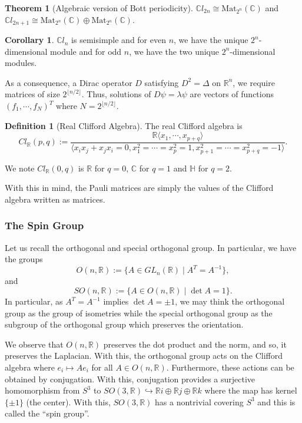 \documentclass[]{article}
\theoremstyle{definition}
\newtheorem{theorem}{Theorem}
\newtheorem{corollary}{Corollary}[theorem]
\theoremstyle{definition}
\newtheorem{definition}{Definition}[section]
\begin{document}
\begin{theorem}[Algebraic version of Bott periodicity]
  \(\mathbb{C}l_{2n} \cong \text{Mat}_{2^n}(\mathbb{C})\) and 
  \(\mathbb{C}l_{2n + 1} \cong \text{Mat}_{2^n}(\mathbb{C}) \oplus 
  \text{Mat}_{2^n}(\mathbb{C})\).
\end{theorem}

\begin{corollary}
  \(\mathbb{C}l_n\) is semisimple and for even \(n\), we have the 
  unique \(2^n\)-dimensional module and for odd \(n\), we have the two 
  unique \(2^n\)-dimensional modules.
\end{corollary}

As a consequence, a Dirac operator \(D\) satisfying \(D^2 = \Delta\) on 
\(\mathbb{R}^n\), we require matrices of size \(2^{\lfloor n / 2\rfloor}\).
Thus, solutions of \(D\psi = \lambda \psi\) are vectors of functions 
\((f_1, \cdots, f_N)^T\) where \(N = 2^{\lfloor n / 2 \rfloor}\).

\begin{definition}[Real Clifford Algebra]
  The real Clifford algebra is 
  \[Cl_{\mathbb{R}}(p, q) := \frac{\mathbb{R}\langle x_1, \cdots, x_{p + q}\rangle}
  {\langle x_i x_j + x_j x_i = 0, x_1^2 = \cdots = x_p^2 = 1, 
    x_{p + 1}^2 = \cdots = x_{p + q}^2 = -1\rangle}.\]
\end{definition}

We note \(Cl_{\mathbb{R}}(0, q)\) is \(\mathbb{R}\) for \(q = 0\), \(\mathbb{C}\) 
for \(q = 1\) and \(\mathbb{H}\) for \(q = 2\).

With this in mind, the Pauli matrices are simply the values of the Clifford 
algebra written as matrices.

\subsubsection{The Spin Group}

Let us recall the orthogonal and special orthogonal group. In particular, we 
have the groups 
\[O(n, \mathbb{R}) := \{A \in GL_n(\mathbb{R}) \mid A^T = A^{-1}\},\]
and 
\[SO(n, \mathbb{R}) := \{A \in O(n, \mathbb{R}) \mid \det A = 1\}.\]
In particular, as \(A^T = A^{-1}\) implies \(\det A = \pm 1\), we may think 
the orthogonal group as the group of isometries while the special orthogonal 
group as the subgroup of the orthogonal group which preserves the orientation.

We observe that \(O(n, \mathbb{R})\) preserves the dot product and the norm, 
and so, it preserves the Laplacian. With this, the orthogonal group acts 
on the Clifford algebra where 
\(e_i \mapsto Ae_i\)
for all \(A \in O(n, \mathbb{R})\). Furthermore, these actions can be obtained 
by conjugation. With this, conjugation provides a surjective homomorphism from 
\(S^3\) to \(SO(3, \mathbb{R}) \hookrightarrow \mathbb{R}i \oplus \mathbb{R}j 
\oplus \mathbb{R}k\) where the map has kernel \(\{\pm 1\}\) (the center).
With this, \(SO(3, \mathbb{R})\) has a nontrivial covering \(S^3\) and this 
is called the ``spin group''.
\end{document}
